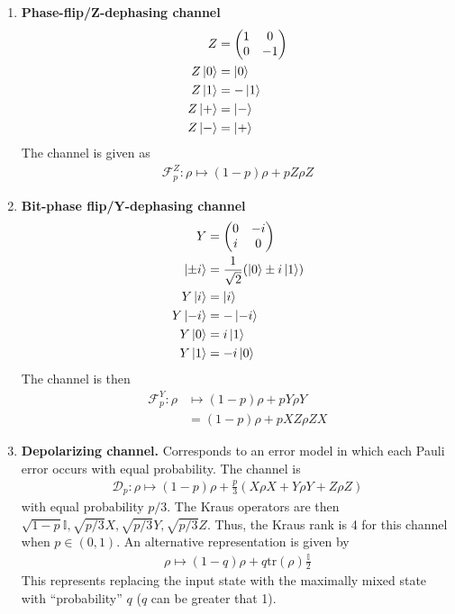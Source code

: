 \documentclass[10pt,oneside,longbibliography]{report}
\begin{document}
\begin{enumerate}
    \item\textbf{ Phase-flip/Z-dephasing channel} 
    \begin{align}
        Z&= \begin{pmatrix}
        1 & 0 \\
        0 & -1
        \end{pmatrix}\\
        Z \ket{0} &= \ket{0}\\
        Z \ket{1} &= -\ket{1} \\
        Z \ket{+} &= \ket{-} \\
        Z \ket{-} &= \ket{+}
    \end{align}
    The channel is given as
    \begin{align}
        \mathcal{F}_{p}^Z: \rho \mapsto (1-p) \rho + p Z\rho Z
    \end{align}
    \item \textbf{Bit-phase flip/Y-dephasing channel}
    \begin{align}
    Y&=\begin{pmatrix}
        0 & -i \\
        i & 0
        \end{pmatrix}\\
        \ket{\pm i} &=\frac{1}{\sqrt{2}}(\ket{0}\pm i\ket{1})\\
        Y \ket{i} &= \ket{i}\\
        Y \ket{-i} &= -\ket{-i} \\
        Y \ket{0} &= i\ket{1} \\
        Y \ket{1} &= -i\ket{0}
    \end{align}
    The channel is then
    \begin{align}
        \mathcal{F}_{p}^Y: \rho &\mapsto (1-p)\rho +p Y\rho Y \\
        &= (1-p)\rho +p XZ\rho ZX 
    \end{align}
    
    \item \textbf{Depolarizing channel.} Corresponds to an error model in which each Pauli error occurs with equal probability. The channel is
    \begin{align}
        \mathcal{D}_p: \rho \mapsto (1-p)\rho + \frac{p}{3}\left(X\rho X + Y\rho Y + Z\rho Z\right)
    \end{align}
    with equal probability $p/3$. The Kraus operators are then $\sqrt{1-p} \mathbb{I}, \sqrt{p/3} X, \sqrt{p/3} Y, \sqrt{p/3}Z$. Thus, the Kraus rank is 4 for this channel when $p\in (0,1)$. An alternative representation is given by 
    \begin{align}
        \rho \mapsto (1-q)\rho + q \text{tr}(\rho) \frac{\mathbb{I}}{2}
    \end{align}
    This represents replacing the input state with the maximally mixed state with ``probability'' $q$ ($q$ can be greater that 1).


\end{enumerate}
\end{document}
